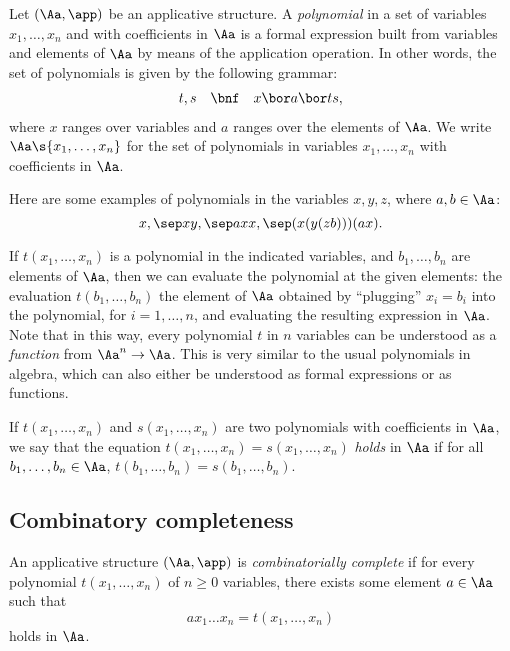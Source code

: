 \documentclass[12pt]{article}
\begin{document}
\begin{definition}
  Let $(\Aa,\app)$ be an applicative structure. A {\em polynomial} in
  a set of variables $x_1,\ldots,x_n$ and with coefficients in $\Aa$
  is a formal expression built from variables and elements of $\Aa$ by
  means of the application operation. In other words, the set of
  polynomials is given by the following grammar:
  \[ \begin{array}{lll}
    t,s&\bnf& x\bor a\bor ts,
  \end{array}
  \]
  where $x$ ranges over variables and $a$ ranges over the elements of
  $\Aa$. We write $\Aa\s{x_1,\ldots,x_n}$ for the set of polynomials
  in variables $x_1,\ldots,x_n$ with coefficients in $\Aa$.
\end{definition}

Here are some examples of polynomials in the variables $x,y,z$,
where $a,b\in\Aa$:
\[ x,\sep xy, \sep axx, \sep (x(y(zb)))(ax).
\]

If $t(x_1,\ldots,x_n)$ is a polynomial in the indicated variables,
and $b_1,\ldots,b_n$ are elements of $\Aa$, then we can evaluate the
polynomial at the given elements: the evaluation $t(b_1,\ldots,b_n)$
the element of $\Aa$ obtained by ``plugging'' $x_i=b_i$ into the
polynomial, for $i=1,\ldots,n$, and evaluating the resulting
expression in $\Aa$. Note that in this way, every polynomial $t$ in
$n$ variables can be understood as a {\em function} from $\Aa^n\to
\Aa$. This is very similar to the usual polynomials in algebra, which
can also either be understood as formal expressions or as functions.

If $t(x_1,\ldots,x_n)$ and $s(x_1,\ldots,x_n)$ are two polynomials
with coefficients in $\Aa$, we say that the equation
$t(x_1,\ldots,x_n) = s(x_1,\ldots,x_n)$ {\em holds} in $\Aa$ if for
all $b_1,\ldots,b_n\in\Aa$, $t(b_1,\ldots,b_n) = s(b_1,\ldots,b_n)$.

\subsection{Combinatory completeness}

\begin{definition}
  An applicative structure $(\Aa,\app)$ is {\em combinatorially
    complete} if for every polynomial $t(x_1,\ldots,x_n)$ of $n\geq 0$
  variables, there exists some element $a\in\Aa$ such that
  \[ ax_1\ldots x_n = t(x_1,\ldots,x_n)
  \]
  holds in $\Aa$.
\end{definition}
\end{document}
